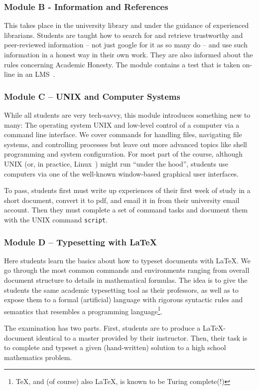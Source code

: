 \documentclass[conference]{IEEEtran}
\begin{document}
\subsubsection{Module B - Information and References} This takes place in the university library and under the guidance of experienced librarians. Students are taught how to search for and retrieve trustworthy and peer-reviewed information -- not just google for it as so many do -- and use such information in a honest way in their own work. They are also informed about the rules concerning Academic Honesty. The module contains a test that is taken on-line in an LMS~\cite{fronter}. 

\subsubsection{Module C – UNIX and Computer Systems} While all students are very tech-savvy, this module introduces something new to many: The operating system UNIX and low-level control of a computer via a command line interface. We cover commands for handling files, navigating file systems, and controlling processes but leave out more advanced topics like shell programming and system configuration. For most part of the course, although UNIX (or, in practice, Linux~\cite{siever2009linux}) might run ``under the hood'', students use computers via one of the well-known window-based graphical user interfaces. 

To pass, students first must write up experiences of their first week of study in a short document, convert it to pdf, and email it in from their university email account. Then they must complete a set of command tasks and document them with the UNIX command \texttt{script}. 

\subsubsection{Module D – Typesetting with \LaTeX} Here students learn the basics about how to typeset documents with \LaTeX. We go through the most common commands and environments ranging from overall document structure to details in mathematical formulas. The idea is to give the students the same academic typesetting tool as their professors, as well as to expose them to a formal (artificial) language with rigorous syntactic rules and semantics that resembles a programming language\footnote{\TeX, and (of course) also \LaTeX, is known to be Turing complete(!)}. 

The examination has two parts. First, students are to  produce a \LaTeX-document identical to a master provided by their instructor. Then, their task is to complete and typeset a given (hand-written) solution to a high school mathematics problem. 
\end{document}
